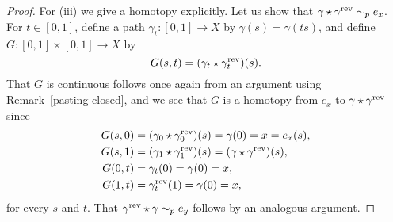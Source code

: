 \begin{proof}
  For (iii) we give a homotopy explicitly. Let us show that $\gamma \star \gamma^{\mathrm{rev}} \sim_p e_x$. For $t \in [0,1]$, define a path $\gamma_t : [0,1] \to X$ by $\gamma(s) = \gamma(ts)$, and define $G : [0,1] \times [0,1] \to X$ by
  \[
    G(s,t) = (\gamma_t \star \gamma_t^{\mathrm{rev}})(s).
  \]
  That $G$ is continuous follows once again from an argument using Remark~\ref{pasting-closed}, and we see that $G$ is a homotopy from $e_x$ to $\gamma \star \gamma^{\mathrm{rev}}$ since
  \begin{align*}
    G(s,0) &= (\gamma_0 \star \gamma_0^{\mathrm{rev}})(s) = \gamma(0) = x = e_x(s),\\
    G(s,1) &= (\gamma_1 \star \gamma_1^{\mathrm{rev}})(s) = (\gamma \star \gamma^{\mathrm{rev}})(s),\\
    G(0,t) &= \gamma_t(0) = \gamma(0) = x,\\
    G(1,t) &= \gamma_t^{\mathrm{rev}}(1) = \gamma(0) = x,
  \end{align*}
  for every $s$ and $t$. That $\gamma^{\mathrm{rev}} \star \gamma \sim_p e_y$ follows by an analogous argument.
\end{proof}


